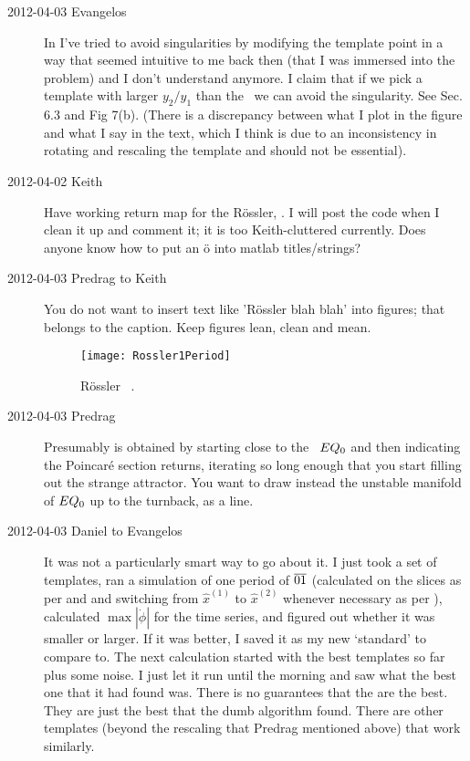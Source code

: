 \begin{description}
\item[2012-04-03 Evangelos]
In  I've tried to avoid singularities by modifying the
template point in a way that seemed intuitive to me back then (that I was immersed
into the problem) and I don't understand anymore. I claim that if we pick a template
with larger $y_2/y_1$ than the \reqv\ we can avoid
the singularity. See Sec. 6.3 and Fig 7(b).
(There is a discrepancy between what I plot in the figure and what I say in the
text, which I think is due to an inconsistency in rotating and rescaling the
template and should not be essential).


\item[2012-04-02 Keith] Have working return map for the
R\"ossler, .  I will post the code
when I clean it up and comment it; it is too Keith-cluttered currently.
Does anyone know how to put an \"o into matlab titles/strings?

\item[2012-04-03 Predrag to Keith] You do not want to insert text like
'R\"ossler blah blah' into figures; that belongs to the caption. Keep
figures lean, clean and mean.

\begin{figure}
\begin{center}
\texttt{[image: Rossler1Period]}
\end{center}
  \caption{
R\"ossler \po\ .
  }
\label{fig:Ros1Per}
\end{figure}

\item[2012-04-03 Predrag] Presumably  is obtained
by starting close to the \eqv\ $EQ_{0}$ and then indicating the
Poincar\'e section returns, iterating so long enough that you start
filling out the strange attractor. You want to draw instead the unstable
manifold of $EQ_{0}$ up to the turnback, as a line.

\item[2012-04-03 Daniel to Evangelos]
It was not a particularly smart way to go about it. I just took a set of
templates, ran a simulation of one period of $\overline{01}$ (calculated
on the slices as per  and   and
switching from $\hat{x}^{(1)}$ to $\hat{x}^{(2)}$ whenever necessary as
per ), calculated $\max |\dot{\phi}|$ for the time
series, and figured out whether it was smaller or larger. If it was
better, I saved it as my new `standard' to compare to. The next
calculation started with the best templates so far plus some noise. I
just let it run until the morning and saw what the best one that it had
found was. There is no guarantees that the are the best. They are just
the best that the dumb algorithm found. There are other templates (beyond
the rescaling that Predrag mentioned above) that work similarly.


\end{description}
